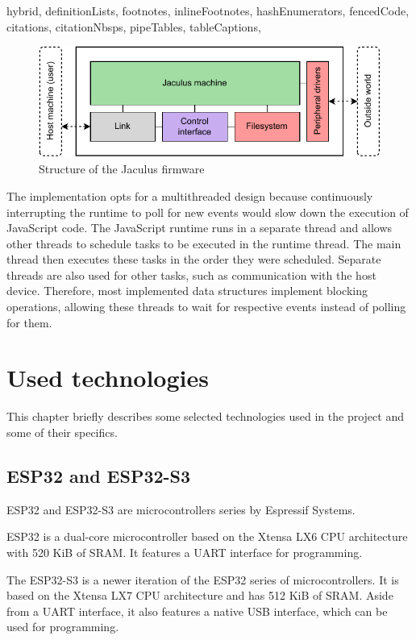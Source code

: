 \begin{markdown*}{%
  hybrid,
  definitionLists,
  footnotes,
  inlineFootnotes,
  hashEnumerators,
  fencedCode,
  citations,
  citationNbsps,
  pipeTables,
  tableCaptions,
}
\begin{figure}[!ht]
  \centering
  \includegraphics[width=\textwidth]{img/jaculus-design}
  \caption{Structure of the Jaculus firmware}
  \label{fig:jaculus-design}
\end{figure}

The implementation opts for a multithreaded design because continuously interrupting the runtime to poll for new events would slow down the execution of JavaScript code. The JavaScript runtime runs in a separate thread and allows other threads to schedule tasks to be executed in the runtime thread. The main thread then executes these tasks in the order they were scheduled. Separate threads are also used for other tasks, such as communication with the host device. Therefore, most implemented data structures implement blocking operations, allowing these threads to wait for respective events instead of polling for them.


\chapter{Used technologies}

This chapter briefly describes some selected technologies used in the project and some of their specifics.

\section{ESP32 and ESP32-S3}

ESP32\cite{esp32} and ESP32-S3\cite{esp32-s3} are microcontrollers series by Espressif Systems.

ESP32 is a dual-core microcontroller based on the Xtensa LX6 CPU architecture with 520 KiB of SRAM. It features a UART interface for programming.

The ESP32-S3 is a newer iteration of the ESP32 series of microcontrollers. It is based on the Xtensa LX7 CPU architecture and has 512 KiB of SRAM. Aside from a UART interface, it also features a native USB interface, which can be used for programming.


\end{markdown*}

